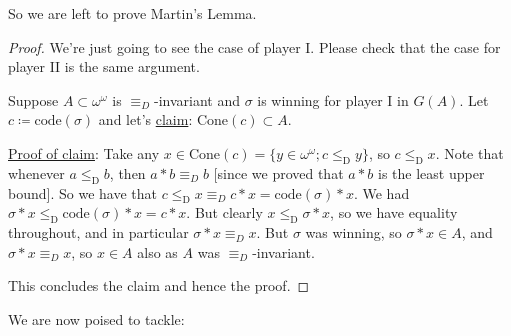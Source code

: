 \documentclass[]{article}
\newcommand{\om}{\omega}
\newcommand{\led}{\le_{\mathrm{D}}}
\newcommand{\cone}{\textrm{Cone}}
\newcommand{\cd}{\textrm{code}}
\begin{document}
So we are left to prove Martin's Lemma.

\begin{proof}
    We're just going to see the case of player I. Please check that the case for player II is the same argument.
    
    Suppose $A\subset \om^\om$ is $\equiv_D$-invariant and $\sigma$ is winning for player I in $G(A)$. Let $c\coloneqq \cd(\sigma)$ and let's \underline{claim}: $\cone(c)\subset A$.

    \underline{Proof of claim}: Take any $x \in \cone(c) = \{y \in \om^\om ; c \led y\}$, so $c\led x$. Note that whenever $a\led b$, then $a\ast b \equiv_D b$ [since we proved that $a \ast b$ is the least upper bound]. So we have that $c\led x \equiv_D c\ast x =\cd(\sigma)\ast x$. We had $\sigma\ast x \led \cd(\sigma)\ast x = c\ast x$. But clearly $x\led \sigma\ast x$, so we have equality throughout, and in particular $\sigma \ast x \equiv_D x$. But $\sigma$ was winning, so $\sigma \ast x \in A$, and $\sigma \ast x \equiv_D x$, so $x \in A$ also as $A$ was $\equiv_D$-invariant. \qedsymbol

    This concludes the claim and hence the proof.
\end{proof}

We are now poised to tackle:
\end{document}
